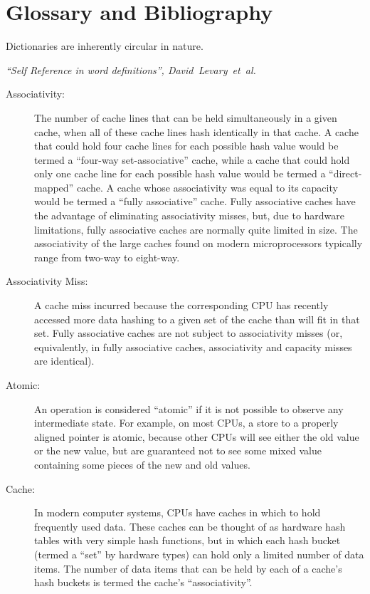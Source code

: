 
\chapter{Glossary and Bibliography}

\epigraph{Dictionaries are inherently circular in nature.}
	 {\emph{``Self Reference in word definitions'',
	        David~Levary~et~al.}}

\begin{description}
\item[Associativity:]
	The number of cache lines that can be held simultaneously in
	a given cache, when all of these cache lines hash identically
	in that cache.
	A cache that could hold four cache lines for each possible
	hash value would be termed a ``four-way set-associative'' cache,
	while a cache that could hold only one cache line for each
	possible hash value would be termed a ``direct-mapped'' cache.
	A cache whose associativity was equal to its capacity would
	be termed a ``fully associative'' cache.
	Fully associative caches have the advantage of eliminating
	associativity misses, but, due to hardware limitations,
	fully associative caches are normally quite limited in size.
	The associativity of the large caches found on modern microprocessors
	typically range from two-way to eight-way.
\item[Associativity Miss:]
	A cache miss incurred because the corresponding CPU has recently
	accessed more data hashing to a given set of the cache than will
	fit in that set.
	Fully associative caches are not subject to associativity misses
	(or, equivalently, in fully associative caches, associativity
	and capacity misses are identical).
\item[Atomic:]
	An operation is considered ``atomic'' if it is not possible to
	observe any intermediate state.
	For example, on most CPUs, a store to a properly aligned pointer
	is atomic, because other CPUs will see either the old value or
	the new value, but are guaranteed not to see some mixed value
	containing some pieces of the new and old values.
\item[Cache:]
	In modern computer systems, CPUs have caches in which to hold
	frequently used data.
	These caches can be thought of as hardware hash tables with very
	simple hash functions,
	but in which each hash bucket (termed a ``set'' by hardware types)
	can hold only a limited number of data items.
	The number of data items that can be held by each of a cache's hash
	buckets is termed the cache's ``associativity''.

\end{description}
